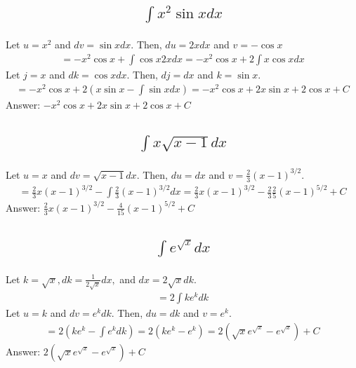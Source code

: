 \documentclass{article}
\begin{document}
\subsection{
	\begin{align*}
		\int{x^2 \sin{x} dx}
	\end{align*}
}
Let $u = x^2$ and $dv = \sin{x} dx$. Then, $du = 2xdx$ and $v = -\cos{x}$
\begin{align*}
	= -x^2 \cos{x} + \int{\cos{x} 2x dx} = -x^2 \cos{x} + 2\int{x \cos{x} dx}
\end{align*}
Let $j = x$ and $dk = \cos{x} dx$. Then, $dj = dx$ and $k = \sin{x}$.
\begin{align*}
	= -x^2 \cos{x} + 2 \left(x \sin{x} - \int{\sin{x} dx} \right) = -x^2 \cos{x} + 2x \sin{x} + 2\cos{x} + C
\end{align*}
Answer: $-x^2 \cos{x} + 2x \sin{x} + 2 \cos{x} + C$

\subsection{
	\begin{align*}
		\int{x \sqrt{x - 1} dx}
	\end{align*}
}
Let $u = x$ and $dv = \sqrt{x - 1}dx$. Then, $du = dx$ and $v = \frac{2}{3}(x - 1)^{3/2}$. 
\begin{align*}
	= \frac{2}{3}x (x - 1)^{3/2} - \int{\frac{2}{3}(x - 1)^{3/2} dx} = \frac{2}{3}x (x - 1)^{3/2} - \frac{2}{3} \frac{2}{5} (x - 1)^{5/2} + C
\end{align*}
Answer: $\frac{2}{3}x (x - 1)^{3/2} - \frac{4}{15} (x - 1)^{5/2} + C$

\subsection{
	\begin{align*}
		\int{e^{\sqrt{x}} dx}
	\end{align*}
}
Let $k = \sqrt{x}, dk = \frac{1}{2\sqrt{x}}dx,$ and $dx = 2\sqrt{x} dk$.
\begin{align*}
	= 2\int{k e^k dk}
\end{align*}
Let $u = k$ and $dv = e^k dk$. Then, $du = dk$ and $v = e^k$. 
\begin{align*}
	= 2(ke^k - \int{e^k dk}) = 2(ke^k - e^k) = 2(\sqrt{x} e^{\sqrt{x}} - e^{\sqrt{x}}) + C
\end{align*}
Answer: $2(\sqrt{x} e^{\sqrt{x}} - e^{\sqrt{x}}) + C$

\end{document}
